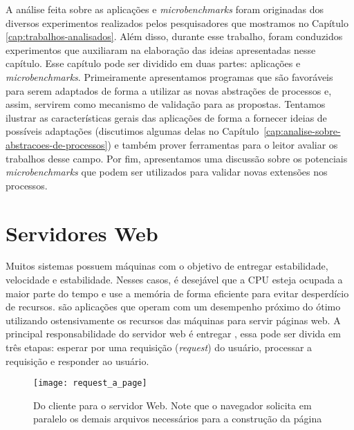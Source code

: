 A análise feita sobre as aplicações e \emph{microbenchmarks} foram originadas
dos diversos experimentos realizados pelos pesquisadores que mostramos no
Capítulo \ref{cap:trabalhos-analisados}. Além disso, durante esse trabalho,
foram conduzidos experimentos que auxiliaram na elaboração das ideias
apresentadas nesse capítulo. Esse capítulo pode ser dividido em duas partes:
aplicações e \emph{microbenchmarks}. Primeiramente apresentamos programas que
são favoráveis para serem adaptados de forma a utilizar as novas abstrações
de processos e, assim, servirem como mecanismo de validação para as propostas.
Tentamos ilustrar as características gerais das aplicações de forma a fornecer
ideias de possíveis adaptações (discutimos algumas delas
no Capítulo~\ref{cap:analise-sobre-abstracoes-de-processos}) e também prover
ferramentas para o leitor avaliar os trabalhos desse campo. Por fim,
apresentamos uma discussão sobre os potenciais \emph{microbenchmarks} que podem
ser utilizados para validar novas extensões nos processos.

\section{Servidores Web}
\label{sec:web_server}

 Muitos sistemas possuem máquinas  com o objetivo de
entregar estabilidade, velocidade e estabilidade. Nesses casos, é desejável que
a CPU esteja ocupada a maior parte do tempo e use a memória de forma eficiente
para evitar desperdício de recursos.  são aplicações que operam com um desempenho próximo
do ótimo utilizando ostensivamente os recursos das máquinas para servir páginas
web. A principal responsabilidade do servidor web é entregar , essa pode ser divida em três etapas: esperar por uma requisição
(\emph{request}) do usuário, processar a requisição e responder ao usuário.

\begin{figure}[!h]
  \centering
  \texttt{[image: request\_a\_page]}
  \caption[Do cliente para o servidor Web.]{Do cliente para o servidor Web. Note que o navegador solicita em paralelo os demais arquivos necessários para a construção da página}
  \label{fig:client_to_web_server}
\end{figure}

